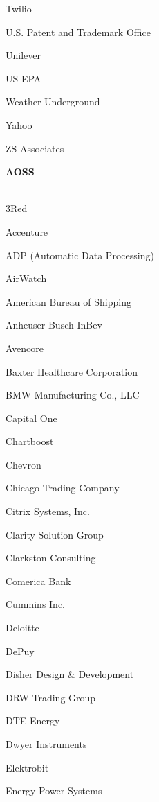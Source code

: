 \documentclass[twoside]{article}
\begin{document}
\begin{center}
\begin{multicols}{5}
\begin{FlushLeft}
\begin{compactitem}
\item Twilio
\item U.S. Patent and Trademark Office
\item Unilever
\item US EPA
\item Weather Underground
\item Yahoo
\item ZS Associates
\end{compactitem}
        \end{FlushLeft}
        \vspace{1em}
        {\fontsize{14}{16}\selectfont \bf AOSS}\\
        \vspace{-1em}
        ~\hrulefill~
        \vspace{-.9em}
        \begin{FlushLeft}
        \begin{compactitem}
        \item 3Red
\item Accenture
\item ADP (Automatic Data Processing)
\item AirWatch
\item American Bureau of Shipping
\item Anheuser Busch InBev
\item Avencore
\item Baxter Healthcare Corporation
\item BMW Manufacturing Co., LLC
\item Capital One
\item Chartboost
\item Chevron
\item Chicago Trading Company
\item Citrix Systems, Inc.
\item Clarity Solution Group
\item Clarkston Consulting
\item Comerica Bank
\item Cummins Inc.
\item Deloitte
\item DePuy
\item Disher Design \& Development
\item DRW Trading Group
\item DTE Energy
\item Dwyer Instruments
\item Elektrobit
\item Energy Power Systems

\end{compactitem}
\end{FlushLeft}
\end{multicols}
\end{center}
\end{document}

